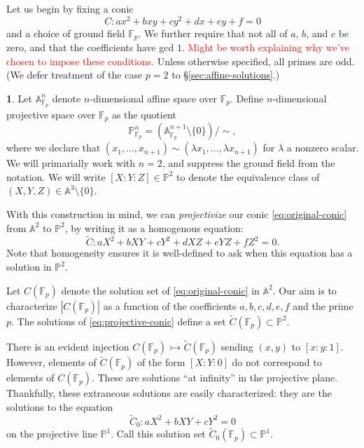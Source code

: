 \documentclass[10pt,a4paper]{amsart}
\numberwithin{equation}{section}
\numberwithin{figure}{section}
\theoremstyle{definition}
\theoremstyle{remark}
\theoremstyle{plain}
\theoremstyle{plain}
\theoremstyle{definition}
\newtheorem{defn}{\protect\definitionname}[section]
\theoremstyle{plain}
\theoremstyle{plain}
\providecommand{\definitionname}{Definition}
\newcommand{\A}{\mathbb{A}}
\renewcommand{\P}{\mathbb{P}}
\newcommand{\F}{\mathbb{F}}
\begin{document}
    Let us  begin by fixing a conic
    \begin{equation}\label{eq:original-conic} 
        C \colon ax^2 + bxy + cy^2 + dx + ey + f = 0 
    \end{equation} 
    and a choice of ground field $\F_p$. We further require that not all of 
    $a$, $b$, and $c$ be zero, and that the coefficients have gcd $1$.
    \textcolor{red}{Might be worth explaining why we've chosen to impose these conditions.}
    Unless otherwise specified, all primes are odd.
    (We defer treatment of the case $p = 2$ to \S\ref{sec:affine-solutions}.)
    \begin{defn}
        Let $\A^n_{\F_p}$ denote $n$-dimensional affine space over $\F_p$. Define 
        $n$-dimensional projective space over $\F_p$ as the quotient
        \[ \P^n_{\F_p} = (\A^{n+1}_{\F_p}\setminus \{0\})/{\sim}, \]
        where we declare that $(x_1,\ldots,x_{n+1}) \sim 
        (\lambda x_1,\ldots,\lambda x_{n+1})$ for $\lambda$ a nonzero scalar. We
        will primarially work with $n = 2$, and suppress the ground field from the 
        notation. We will write $[X:Y:Z]\in \P^2$ to denote the equivalence 
        class of $(X,Y,Z)\in \A^3 \setminus \{0\}$.
    \end{defn}

    With this construction in mind, we can \emph{projectivize} our conic
    \eqref{eq:original-conic} from $\A^2$ to $\P^2$, by writing it as a 
    homogenous equation: 
    \begin{equation}\label{eq:projective-conic} 
        \widetilde{C} \colon aX^2 + bXY + cY^2 + dXZ + eYZ + fZ^2 = 0. 
    \end{equation}
    Note that homogeneity ensures it is well-defined to ask when this
    equation has a solution in $\P^2$.

    Let $C(\F_p)$ denote the solution set of \eqref{eq:original-conic} in $\A^2$. Our aim
    is to characterize $|C(\F_p)|$ as a function of the coefficients $a,b,c,d,e,f$ and 
    the prime $p$. The solutions of \eqref{eq:projective-conic} define a set
    $\widetilde{C}(\F_p) \subset \P^2$.

    There is an evident injection $C(\F_p) \rightarrowtail \widetilde{C}(\F_p)$ sending $(x,y)$ to
    $[x:y:1]$. However, elements of $\widetilde{C}(\F_p)$ of the form $[X:Y:0]$ do not 
    correspond to elements of $C(\F_p)$. 
    These are solutions ``at infinity'' in the projective plane.
    Thankfully, these extraneous solutions are easily characterized: they are the
    solutions to the equation
    \begin{equation}\label{eq:projective-conic-at-infinity} 
        \widetilde{C}_0 \colon aX^2 + bXY + cY^2 = 0
    \end{equation} 
    on the projective line $\P^1$. Call this solution set $\widetilde{C}_0(\F_p)\subset \P^1$.  
\end{document}
